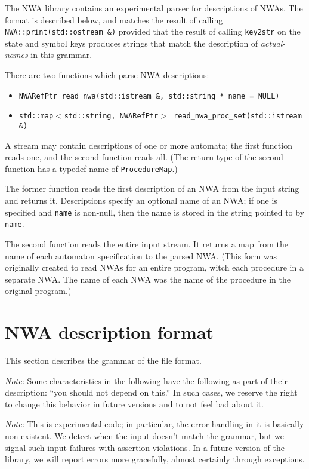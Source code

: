 The NWA library contains an experimental parser for descriptions of
NWAs. The format is described below, and matches the result of calling
\texttt{NWA::print(std::ostream &)} provided that the result of
calling \texttt{key2str} on the state and symbol keys produces strings
that match the description of \textsl{actual-names} in this grammar.

There are two functions which parse NWA descriptions:
\begin{itemize}
  \item\texttt{NWARefPtr read\_nwa(std::istream &, std::string * name = NULL)}
  \item\texttt{std::map$<$std::string, NWARefPtr$>$ read\_nwa\_proc\_set(std::istream &)}
\end{itemize}
A stream may contain descriptions of one or more automata; the first
function reads one, and the second function reads all.  (The return
type of the second function has a typedef name of
\texttt{ProcedureMap}.)

The former function reads the first description of an NWA from the
input string and returns it. Descriptions specify an optional name of
an NWA; if one is specified and \texttt{name} is non-null, then the
name is stored in the string pointed to by \texttt{name}.

The second function reads the entire input stream. It returns a map
from the name of each automaton specification to the parsed NWA. (This
form was originally created to read NWAs for an entire program, witch
each procedure in a separate NWA. The name of each NWA was the name of
the procedure in the original program.)

\section{NWA description format}

This section describes the grammar of the file format.

\textsl{Note:} Some characteristics in the following have the
following as part of their description: ``you should not depend on
this.'' In such cases, we reserve the right to change this behavior in
future versions and to not feel bad about it.

\textsl{Note:} This is experimental code; in particular, the
error-handling in it is basically non-existent. We detect when the
input doesn't match the grammar, but we signal such input failures
with assertion violations. In a future version of the library, we will
report errors more gracefully, almost certainly through exceptions.

